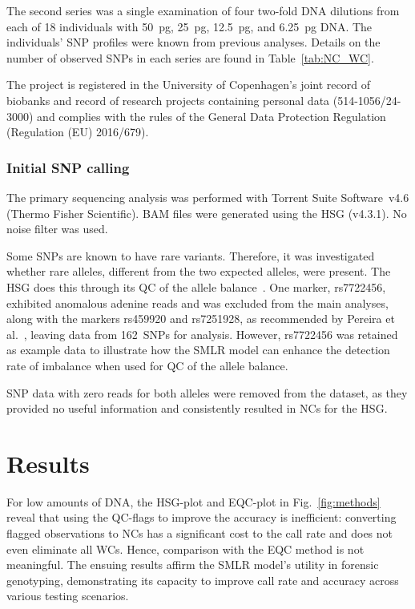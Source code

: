 \documentclass[preprint,5p,times,11pt]{elsarticle}
\begin{document}
The second series was a single examination of four two-fold DNA dilutions from each of 18 individuals with \SI{50}{\pg}, \SI{25}{\pg}, \SI{12.5}{\pg}, and \SI{6.25}{\pg} DNA.
The individuals' SNP profiles were known from previous analyses.
Details on the number of observed SNPs in each series are found in Table~\ref{tab:NC_WC}.

The project is registered in the University of Copenhagen’s joint record of biobanks and record of research projects containing personal data (514-1056/24-3000) and complies with the rules of the General Data Protection Regulation (Regulation (EU) 2016/679).


\subsubsection{Initial SNP calling}
The primary sequencing analysis was performed with Torrent Suite Software~v4.6 (Thermo Fisher Scientific).
BAM files were generated using the HSG (v4.3.1).
No noise filter was used.

Some SNPs are known to have rare variants.
Therefore, it was investigated whether rare alleles, different from the two expected alleles, were present.
The HSG does this through its QC of the allele balance~\cite[p.~35]{hid}.
One marker, rs7722456, exhibited anomalous adenine reads and was excluded from the main analyses, along with the markers rs459920 and rs7251928, as recommended by Pereira et al.~\cite{pereira}, leaving data from 162~SNPs for analysis.
However, rs7722456 was retained as example data to illustrate how the SMLR model can enhance the detection rate of imbalance when used for QC of the allele balance.

SNP data with zero reads for both alleles were removed from the dataset, as they provided no useful information and consistently resulted in NCs for the HSG.



\section{Results}
For low amounts of DNA, the HSG-plot and EQC-plot in Fig.~\ref{fig:methods} reveal that using the QC-flags to improve the accuracy is inefficient:
converting flagged observations to NCs has a significant cost to the call rate and does not even eliminate all WCs.
Hence, comparison with the EQC method is not meaningful.
The ensuing results affirm the SMLR model's utility in forensic genotyping, demonstrating its capacity to improve call rate and accuracy across various testing scenarios.
\end{document}
